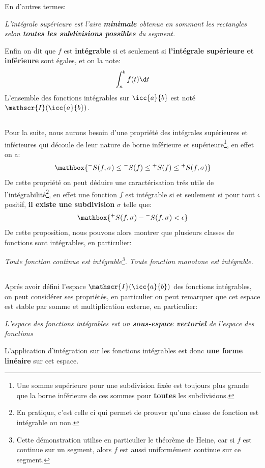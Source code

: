 En d'autres termes:
\begin{center}
   \textit{
      L'intégrale supérieure est l'aire \textbf{minimale} obtenue en sommant les rectangles selon \textbf{toutes les subdivisions possibles} du segment.
   }
\end{center}\<
\pagebreak

Enfin on dit que \(f\) est \textbf{intégrable} si et seulement si \textbf{l'intégrale supérieure et inférieure} sont égales, et on la note:
\[
   \int_{a}^{b} f(t) \d t  
\]
L'ensemble des fonctions intégrables sur \(\icc{a}{b}\) est noté \(\mathscr{I}(\icc{a}{b})\).

\subsection*{}
Pour la suite, nous aurons besoin d'une propriété des intégrales supérieures et inférieures qui découle de leur nature de borne inférieure et supérieure\footnote[1]{Une somme supérieure pour une subdivision fixée est toujours plus grande que la borne inférieure de ces sommes pour \textbf{toutes} les subdivisions.}, en effet on a:
\[
   \mathbox{  {}^{-}S(f, \sigma) \leq {}^{-}S(f) \leq {}^{+}S(f) \leq {}^{+}S(f, \sigma)}   
\]
De cette propriété on peut déduire une caractérisation trés utile de l'intégrabilité\footnote[2]{En pratique, c'est celle ci qui permet de prouver qu'une classe de fonction est intégrable ou non.}, en effet une fonction \(f\) est intégrable si et seulement si pour tout \(\epsilon\) positif, \textbf{il existe une subdivision} \(\sigma\) telle que:
\[
   \mathbox{{}^{+}S(f, \sigma) - {}^{-}S(f, \sigma) < \epsilon}   
\]
De cette proposition, nous pouvons alors montrer que plusieurs classes de fonctions sont intégrables, en particulier:
\begin{center}
   \textit{Toute fonction continue est intégrable\footnote[3]{Cette démonstration utilise en particulier le théorème de Heine, car si \(f\) est continue sur un segment, alors \(f\) est aussi uniformément continue sur ce segment.}.}\+
   \textit{Toute fonction monotone est intégrable. }
\end{center}

\subsection*{}
Aprés avoir défini l'espace \(\mathscr{I}(\icc{a}{b})\) des fonctions intégrables, on peut considérer ses propriétés, en particulier on peut remarquer que cet espace est stable par somme et multiplication externe, en particulier:
\begin{center}
   \textit{L'espace des fonctions intégrables est un \textbf{sous-espace vectoriel} de l'espace des fonctions}
\end{center}
L'application d'intégration sur les fonctions intégrables est donc \textbf{une forme linéaire} sur cet espace.\<


